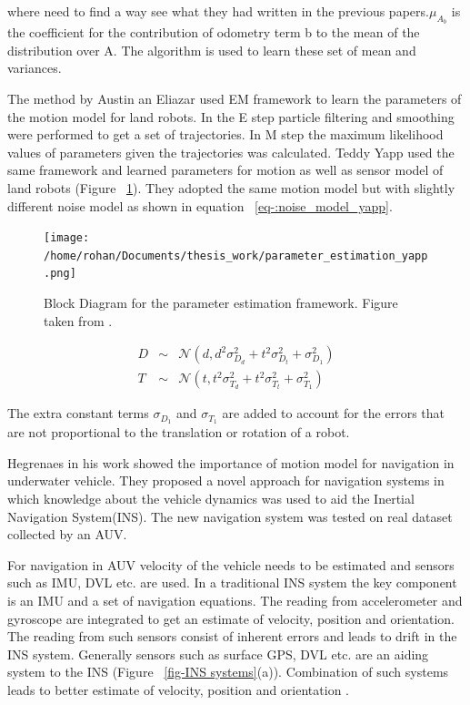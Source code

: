 \documentclass[12pt]{dalcsthesis}
\begin{document}
where need to find a way see what they had written in the previous papers.$\mu_{A_{b}}$ is the coefficient for the contribution of odometry term b to the mean of the distribution over A. The algorithm is used to learn these set of mean and variances.

The method by Austin an Eliazar used EM framework to learn the parameters of the motion model for land robots. In the E step particle filtering and smoothing were performed to get a set of trajectories. In M step the maximum likelihood values of parameters given the trajectories was calculated. Teddy Yapp \cite{Yap2008} used the same framework and learned parameters for motion as well as sensor model of land robots (Figure ~\ref{fig-parameter_estimation Yapp}). They adopted the same motion model but with slightly different noise model as shown in equation ~\ref{eq-:noise_model_yapp}.
\begin{figure}
  \centering
     {\texttt{[image: /home/rohan/Documents/thesis\_work/parameter\_estimation\_yapp.png]}}
  \caption{\label{fig-parameter_estimation Yapp} Block Diagram for the parameter estimation framework. Figure taken from \cite{Yap2008}.}
\end{figure}

\begin{equation}
\label{eq-:noise_model_yapp}
\begin{aligned}
D &\sim& \mathcal{{N}}(d,d^2\sigma_{D_{d}}^2+t^2\sigma_{D_{t}}^2+\sigma_{D_{1}}^2) \\
T &\sim& \mathcal{{N}}(t,t^2\sigma_{T_{d}}^2+t^2\sigma_{T_{t}}^2+\sigma_{T_{1}}^2)
\end{aligned}
\end{equation}

The extra constant terms $\sigma_{D_{1}}$ and $\sigma_{T_{1}}$ are added to account for the errors that are not proportional to the translation or rotation of a robot. 

Hegrenaes \cite{Hegrenæs2008} in his work showed the importance of motion model for navigation in underwater vehicle. They proposed a novel approach for navigation systems in which knowledge about the vehicle dynamics was used to aid the Inertial Navigation System(INS). The new navigation system was tested on real dataset collected by an AUV.

For navigation in AUV velocity of the vehicle needs to be estimated and sensors such as IMU, DVL etc. are used. In a traditional INS system the key component is an IMU and a set of navigation equations. The reading from accelerometer and gyroscope are integrated to get an estimate of velocity, position and orientation. The reading from such sensors consist of inherent errors and leads to drift in the INS system. Generally sensors such as surface GPS, DVL etc. are an aiding system to the INS (Figure ~\ref{fig-INS systems}(a)). Combination of such systems leads to better estimate of velocity, position and orientation \cite{leonard1998autonomous}. 
\end{document}
